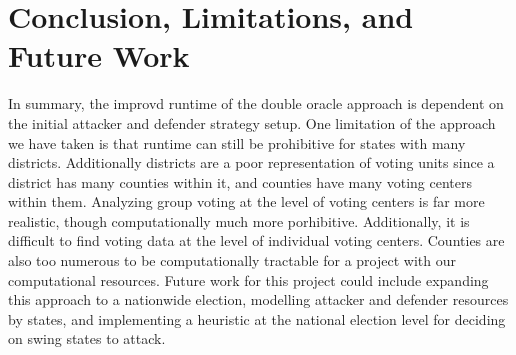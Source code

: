\documentclass[letterpaper]{article} %
\begin{document}
\section{Conclusion, Limitations, and Future Work}
In summary, the improvd runtime of the double oracle approach is dependent on the initial attacker and defender strategy setup. One limitation of the approach we have taken is that runtime can still be prohibitive for states with many districts. Additionally districts are a poor representation of voting units since a district has many counties within it, and counties have many voting centers within them. Analyzing group voting at the level of voting centers is far more realistic, though computationally much more porhibitive. Additionally, it is difficult to find voting data at the level of individual voting centers. Counties are also too numerous to be computationally tractable for a project with our computational resources. Future work for this project could include expanding this approach to a nationwide election, modelling attacker and defender resources by states, and implementing a heuristic at the national election level for deciding on swing states to attack.
{


}
\end{document}
